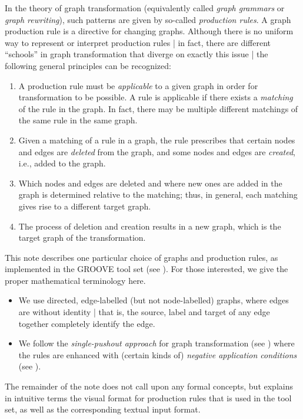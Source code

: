 In the theory of graph transformation (equivalently called \emph{graph
grammars} or \emph{graph rewriting}), such patterns are given by
so-called \emph{production rules}. A graph production rule is a directive for
changing graphs. Although there is no uniform way to represent or 
interpret production rules | in fact, there are different ``schools'' in graph
transformation that diverge on exactly this issue | the following general
principles can be recognized:
\begin{enumerate}
\item A production rule must be \emph{applicable} to a given graph in order for 
   transformation to be possible. A rule is applicable if there exists a
  \emph{matching} of the rule in the graph. In fact, there may be multiple
  different matchings of the same rule in the same graph.
\item Given a matching of a rule in a graph, the rule prescribes that certain
  nodes and edges are \emph{deleted} from the graph, and some nodes and edges
  are \emph{created}, i.e., added to the graph.
\item Which nodes and edges are deleted and where new ones are added in the
  graph is determined relative to the matching; thus, in general, each matching
  gives rise to a different target graph.
\item The process of deletion and creation results in a new graph, which is the
  target graph of the transformation.
\end{enumerate}
This note describes one particular choice of graphs and production rules, as
implemented in the GROOVE tool set (see \cite{Rens03d}). For those interested,
we give the proper mathematical terminology here.
\begin{itemize}
\item We use directed, edge-labelled (but not node-labelled) graphs, where
  edges are without identity | that is, the source, label and target of any
  edge together completely identify the edge.
\item We follow the \emph{single-pushout approach} for graph transformation
  (see \cite{Loew93,Ehri+97}) where the rules are enhanced with (certain kinds
  of) \emph{negative application conditions} (see \cite{HabHecTae96}).
\end{itemize}
The remainder of the note does not call upon any formal concepts, but explains
in intuitive terms the visual format for production rules that is used in
the tool set, as well as the corresponding textual input format.


